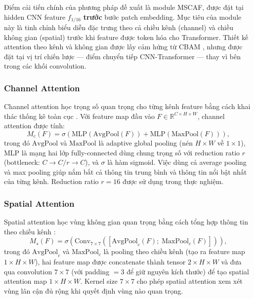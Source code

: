 \documentclass[10pt,a4paper]{article}
\begin{document}
Điểm cải tiến chính của phương pháp đề xuất là module MSCAF, được đặt tại hidden CNN feature $f_{1/16}$ \textbf{trước} bước patch embedding. Mục tiêu của module này là tinh chỉnh biểu diễn đặc trưng theo cả chiều kênh (channel) và chiều không gian (spatial) trước khi feature được token hóa cho Transformer. Thiết kế attention theo kênh và không gian được lấy cảm hứng từ CBAM \cite{woo2018cbam}, nhưng được đặt tại vị trí chiến lược --- điểm chuyển tiếp CNN-Transformer --- thay vì bên trong các khối convolution.

\subsubsection{Channel Attention}

Channel attention học trọng số quan trọng cho từng kênh feature bằng cách khai thác thống kê toàn cục \cite{woo2018cbam}. Với feature map đầu vào $F \in \mathbb{R}^{C \times H \times W}$, channel attention được tính:
\begin{equation}
    M_c(F) = \sigma\left(\text{MLP}(\text{AvgPool}(F)) + \text{MLP}(\text{MaxPool}(F))\right),
    \label{eq:channel-attention}
\end{equation}
trong đó $\text{AvgPool}$ và $\text{MaxPool}$ là adaptive global pooling (nén $H \times W$ về $1 \times 1$), MLP là mạng hai lớp fully-connected dùng chung trọng số với reduction ratio $r$ (bottleneck: $C \rightarrow C/r \rightarrow C$), và $\sigma$ là hàm sigmoid. Việc dùng cả average pooling và max pooling giúp nắm bắt cả thông tin trung bình và thông tin nổi bật nhất của từng kênh. Reduction ratio $r=16$ được sử dụng trong thực nghiệm.

\subsubsection{Spatial Attention}

Spatial attention học vùng không gian quan trọng bằng cách tổng hợp thông tin theo chiều kênh \cite{woo2018cbam}:
\begin{equation}
    M_s(F) = \sigma\left(\text{Conv}_{7\times7}\left([\text{AvgPool}_c(F);\; \text{MaxPool}_c(F)]\right)\right),
    \label{eq:spatial-attention}
\end{equation}
trong đó $\text{AvgPool}_c$ và $\text{MaxPool}_c$ là pooling theo chiều kênh (tạo ra feature map $1 \times H \times W$), hai feature map được concatenate thành tensor $2 \times H \times W$ và đưa qua convolution $7\times7$ (với padding $= 3$ để giữ nguyên kích thước) để tạo spatial attention map $1 \times H \times W$. Kernel size $7\times7$ cho phép spatial attention xem xét vùng lân cận đủ rộng khi quyết định vùng nào quan trọng.
\end{document}
